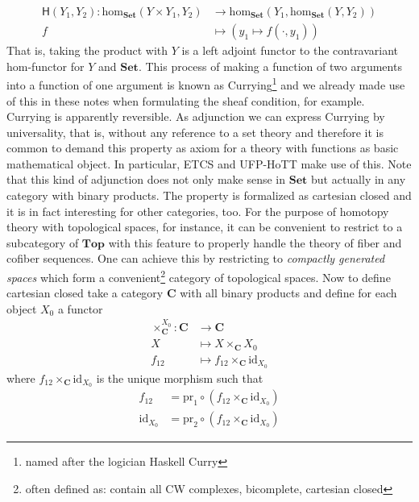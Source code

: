 \begin{align*}
  \mathsf{H}(Y_{1},Y_{2})
  \colon
  \mathrm{hom}_{\mathbf{Set}}(Y \times Y_{1},Y_{2})
  &\rightarrow
  \mathrm{hom}_{\mathbf{Set}}
  \left(
    Y_{1},
    \mathrm{hom}_{\mathbf{Set}}(Y,Y_{2})
  \right)
  \\
  f
  &\mapsto
  \left(
    y_{1}
    \mapsto
    f(\cdot,y_{1})
  \right)
\end{align*}
That is, taking the product with $Y$ is a left adjoint functor to the contravariant hom-functor for $Y$ and $\mathbf{Set}$. This process of making a function of two arguments into a function of one argument is known as Currying\footnote{named after the logician Haskell Curry} and we already made use of this in these notes when formulating the sheaf condition, for example. Currying is apparently reversible. As adjunction we can express Currying by universality, that is, without any reference to a set theory and therefore it is common to demand this property as axiom for a theory with functions as basic mathematical object. In particular, ETCS and UFP-HoTT make use of this. Note that this kind of adjunction does not only make sense in $\mathbf{Set}$ but actually in any category with binary products. The property is formalized as cartesian closed and it is in fact interesting for other categories, too. For the purpose of homotopy theory with topological spaces, for instance, it can be convenient to restrict to a subcategory of $\mathbf{Top}$ with this feature to properly handle the theory of fiber and cofiber sequences. One can achieve this by restricting to \textit{compactly generated spaces} which form a convenient\footnote{often defined as: contain all CW complexes, bicomplete, cartesian closed} category of topological spaces. Now to define cartesian closed take a category $\mathbf{C}$ with all binary products and define for each object $X_{0}$ a functor
\begin{align*}
  \times_{\mathbf{C}}^{X_{0}}
  \colon
  \mathbf{C}
  &\rightarrow
  \mathbf{C}
  \\
  X
  &\mapsto
  X
  \times_{\mathbf{C}}
  X_{0}
  \\
  f_{12}
  &\mapsto
  f_{12}
  \times_{\mathbf{C}}
  \mathrm{id}_{X_{0}}
\end{align*}
where $f_{12} \times_{\mathbf{C}} \mathrm{id}_{X_{0}}$ is the unique morphism such that
\begin{align*}
  f_{12}
  &=
  \mathrm{pr}_{1}
  \circ
  \left(
    f_{12}
    \times_{\mathbf{C}}
    \mathrm{id}_{X_{0}}
  \right)
  \\
  \mathrm{id}_{X_{0}}
  &=
  \mathrm{pr}_{2}
  \circ
  \left(
    f_{12}
    \times_{\mathbf{C}}
    \mathrm{id}_{X_{0}}
  \right)
\end{align*}
